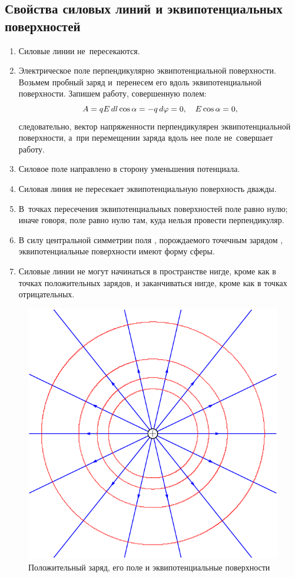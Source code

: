 	\subsection{Свойства силовых линий и эквипотенциальных поверхностей}
		\begin{enumerate}
			\item Силовые линии не~пересекаются.
			\item Электрическое поле  перпендикулярно эквипотенциальной поверхности. Возьмем пробный заряд  и~перенесем его вдоль эквипотенциальной поверхности. Запишем работу, совершенную полем:
				$$A=qE\,d l\cos{\alpha}=-q\,d \varphi = 0, \quad E\cos{\alpha}=0,$$
				следовательно, вектор напряженности  перпендикулярен эквипотенциальной поверхности, а~при перемещении заряда вдоль нее поле не~совершает работу.
			\item Силовое поле направлено в сторону уменьшения потенциала.
			\item Силовая линия  не пересекает эквипотенциальную поверхность дважды.
			\item В~точках пересечения эквипотенциальных поверхностей поле равно нулю; иначе говоря, поле равно нулю там, куда нельзя провести перпендикуляр.
			\item В силу центральной симметрии поля , порождаемого точечным зарядом , эквипотенциальные поверхности имеют форму сферы.
			\item Силовые линии  не могут начинаться в пространстве нигде, кроме как в точках положительных зарядов, и заканчиваться нигде, кроме как в точках отрицательных.
		\end{enumerate}
		\begin{figure}[h!]
			\centering
			\includegraphics[scale=0.75]{./img/fig14/fig14.pdf}
			\caption{Положительный заряд, его поле и эквипотенциальные поверхности}
		\end{figure}
